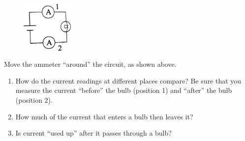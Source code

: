 \documentclass{article}
\begin{document}
\begin{figure}[h]
  \centering
  \includegraphics[width=1in]{3.png}
\end{figure}
Move the ammeter ``around'' the circuit, as shown above.
\begin{enumerate}[resume]
  \item How do the current readings at different places compare?  Be sure that you measure the current ``before'' the bulb (position 1) and ``after'' the bulb (position 2).
  \item How much of the current that enters a bulb then leaves it? 
  \item Is current ``used up'' after it passes through a bulb?
\end{enumerate}

\newpage{}
\end{document}
